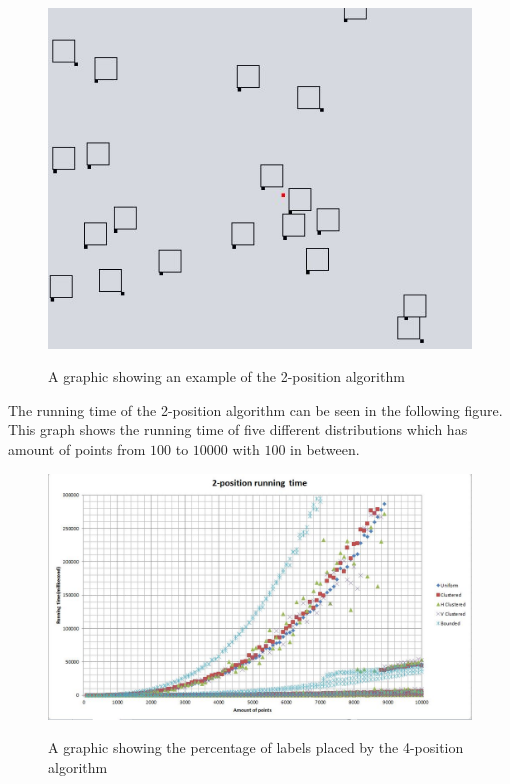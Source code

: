 \documentclass[crop=false,a4paper,oneside,11pt]{standalone}
\begin{document}
\begin{figure}[h!]
\centering
  \includegraphics[scale = 0.5]{2pos_example.JPG}\\
  \caption{A graphic showing an example of the 2-position algorithm}
 \end{figure}

The running time of the 2-position algorithm can be seen in the following figure. This graph shows the running time of five different distributions which has amount of points from $100$ to $10000$ with $100$ in between.
\begin{figure}[h!]
 \centering
  \includegraphics[scale = 0.5]{2PosRunningTime.JPG}\\
  \caption{A graphic showing the percentage of labels placed by the 4-position algorithm}
 \end{figure}
\end{document}

